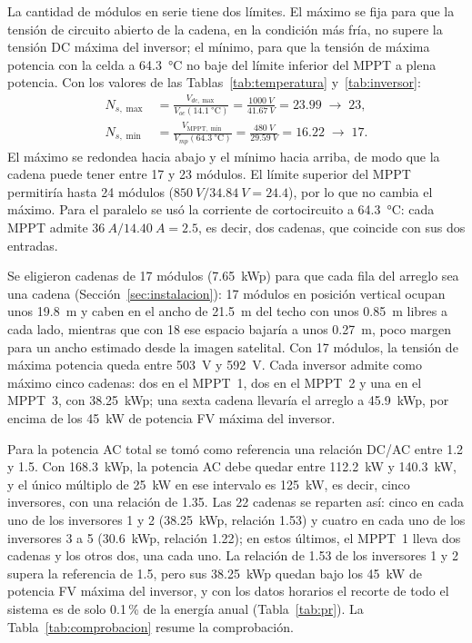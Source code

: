 La cantidad de módulos en serie tiene dos límites. El máximo se fija para que la tensión de circuito abierto de la cadena, en la condición más fría, no supere la tensión DC máxima del inversor; el mínimo, para que la tensión de máxima potencia con la celda a \SI{64.3}{\celsius} no baje del límite inferior del MPPT a plena potencia. Con los valores de las Tablas~\ref{tab:temperatura} y~\ref{tab:inversor}:
\begin{align}
N_{s,\max} &= \frac{V_{dc,\max}}{V_{oc}(\SI{14.1}{\celsius})} = \frac{\SI{1000}{V}}{\SI{41.67}{V}} = 23.99 \;\rightarrow\; 23, \label{eq:nsmax}\\
N_{s,\min} &= \frac{V_{\mathrm{MPPT},\min}}{V_{mp}(\SI{64.3}{\celsius})} = \frac{\SI{480}{V}}{\SI{29.59}{V}} = 16.22 \;\rightarrow\; 17. \label{eq:nsmin}
\end{align}
El máximo se redondea hacia abajo y el mínimo hacia arriba, de modo que la cadena puede tener entre 17 y 23 módulos. El límite superior del MPPT permitiría hasta 24 módulos ($\SI{850}{V}/\SI{34.84}{V}=24.4$), por lo que no cambia el máximo. Para el paralelo se usó la corriente de cortocircuito a \SI{64.3}{\celsius}: cada MPPT admite $\SI{36}{A}/\SI{14.40}{A}=2.5$, es decir, dos cadenas, que coincide con sus dos entradas.

Se eligieron cadenas de 17 módulos (\SI{7.65}{kWp}) para que cada fila del arreglo sea una cadena (Sección~\ref{sec:instalacion}): 17 módulos en posición vertical ocupan unos \SI{19.8}{m} y caben en el ancho de \SI{21.5}{m} del techo con unos \SI{0.85}{m} libres a cada lado, mientras que con 18 ese espacio bajaría a unos \SI{0.27}{m}, poco margen para un ancho estimado desde la imagen satelital. Con 17 módulos, la tensión de máxima potencia queda entre \SI{503}{V} y \SI{592}{V}. Cada inversor admite como máximo cinco cadenas: dos en el MPPT~1, dos en el MPPT~2 y una en el MPPT~3, con \SI{38.25}{kWp}; una sexta cadena llevaría el arreglo a \SI{45.9}{kWp}, por encima de los \SI{45}{kW} de potencia FV máxima del inversor.

Para la potencia AC total se tomó como referencia una relación DC/AC entre 1.2 y 1.5. Con \SI{168.3}{kWp}, la potencia AC debe quedar entre \SI{112.2}{kW} y \SI{140.3}{kW}, y el único múltiplo de \SI{25}{kW} en ese intervalo es \SI{125}{kW}, es decir, cinco inversores, con una relación de 1.35. Las 22 cadenas se reparten así: cinco en cada uno de los inversores 1 y 2 (\SI{38.25}{kWp}, relación 1.53) y cuatro en cada uno de los inversores 3 a 5 (\SI{30.6}{kWp}, relación 1.22); en estos últimos, el MPPT~1 lleva dos cadenas y los otros dos, una cada uno. La relación de 1.53 de los inversores 1 y 2 supera la referencia de 1.5, pero sus \SI{38.25}{kWp} quedan bajo los \SI{45}{kW} de potencia FV máxima del inversor, y con los datos horarios el recorte de todo el sistema es de solo 0.1\,\% de la energía anual (Tabla~\ref{tab:pr}). La Tabla~\ref{tab:comprobacion} resume la comprobación.


